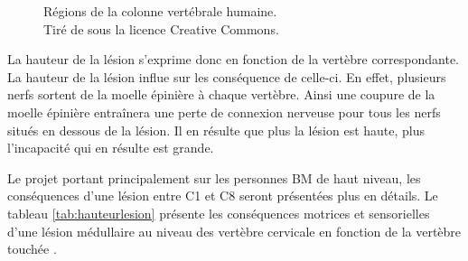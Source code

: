\documentclass[letterpaper, twoside, 12pt, memoire, creativecommons, hyperref]{thETS}
\begin{document}
\begin{figure}
	\centering
	\caption{Régions de la colonne vertébrale humaine. \\ Tiré de \cite{rachisWiki} sous la licence Creative Commons.}
	\label{fig:rachis}
\end{figure}

La hauteur de la lésion s'exprime donc en fonction de la vertèbre correspondante. La hauteur de la lésion influe sur les conséquence de celle-ci. En effet, plusieurs nerfs sortent de la moelle épinière à chaque vertèbre. Ainsi une coupure de la moelle épinière entraînera une perte de connexion nerveuse pour tous les nerfs situés en dessous de la lésion. Il en résulte que plus la lésion est haute, plus l'incapacité qui en résulte est grande. 

Le projet portant principalement sur les personnes BM de haut niveau, les conséquences d'une lésion entre C1 et C8 seront présentées plus en détails. Le tableau \ref{tab:hauteurlesion} présente les conséquences motrices et sensorielles d'une lésion médullaire au niveau des vertèbre cervicale en fonction de la vertèbre touchée \citep{apparelyzed2008}.
\end{document}
